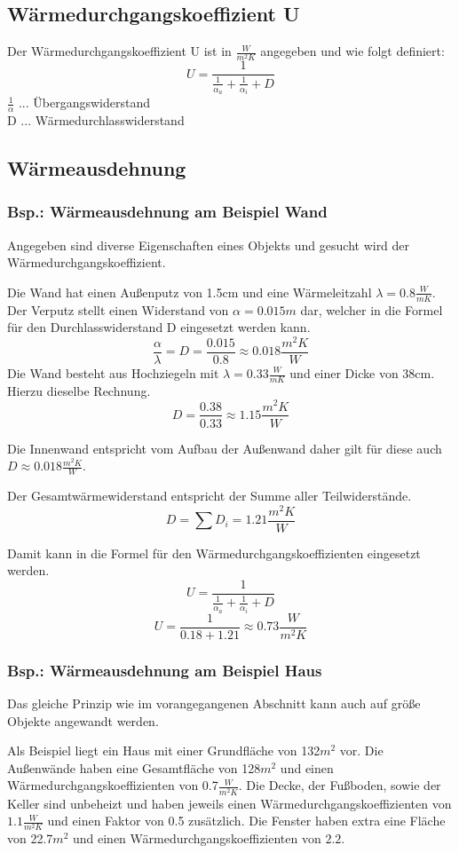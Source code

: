 \documentclass[a4paper,12pt]{article}
\begin{document}
\subsection{Wärmedurchgangskoeffizient U}
Der Wärmedurchgangskoeffizient U ist in $\frac{W}{m^2 K}$ angegeben und wie folgt definiert:
$$U = \frac{1}{\frac{1}{\alpha_a} + \frac{1}{\alpha_i} + D}$$
$\frac{1}{\alpha}$ ... Übergangswiderstand\\
D ... Wärmedurchlasswiderstand

\subsection{Wärmeausdehnung}
\subsubsection{Bsp.: Wärmeausdehnung am Beispiel Wand}
Angegeben sind diverse Eigenschaften eines Objekts und gesucht wird der Wärmedurchgangskoeffizient.

Die Wand hat einen Außenputz von 1.5cm und eine Wärmeleitzahl $\lambda = 0.8 \frac{W}{m K}$. Der Verputz stellt einen Widerstand von $\alpha = 0.015m$ dar, welcher in die Formel für den Durchlasswiderstand D eingesetzt werden kann.
$$\frac{\alpha}{\lambda} = D = \frac{0.015}{0.8} \approx 0.018\frac{m^2 K}{W}$$
Die Wand besteht aus Hochziegeln mit $\lambda = 0.33\frac{W}{m K}$ und einer Dicke von 38cm. Hierzu dieselbe Rechnung.
$$D = \frac{0.38}{0.33} \approx 1.15\frac{m^2 K}{W}$$

Die Innenwand entspricht vom Aufbau der Außenwand daher gilt für diese auch $D \approx 0.018\frac{m^2 K}{W}$.

Der Gesamtwärmewiderstand entspricht der Summe aller Teilwiderstände.
$$D = \sum D_i = 1.21\frac{m^2 K}{W}$$

Damit kann in die Formel für den Wärmedurchgangskoeffizienten eingesetzt werden.
$$U = \frac{1}{\frac{1}{\alpha_a} + \frac{1}{\alpha_i} + D}$$
$$U = \frac{1}{0.18 + 1.21} \approx 0.73\frac{W}{m^2 K}$$

\subsubsection{Bsp.: Wärmeausdehnung am Beispiel Haus}
Das gleiche Prinzip wie im vorangegangenen Abschnitt kann auch auf größe Objekte angewandt werden.

Als Beispiel liegt ein Haus mit einer Grundfläche von 132$m^2$ vor. Die Außenwände haben eine Gesamtfläche von 128$m^2$ und einen Wärmedurchgangskoeffizienten von 0.7$\frac{W}{m^2 K}$. 
Die Decke, der Fußboden, sowie der Keller sind unbeheizt und haben jeweils einen Wärmedurchgangskoeffizienten von $1.1\frac{W}{m^2 K}$ und einen Faktor von 0.5 zusätzlich. 
Die Fenster haben extra eine Fläche von 22.7$m^2$ und einen Wärmedurchgangskoeffizienten von $2.2$. 
\end{document}
